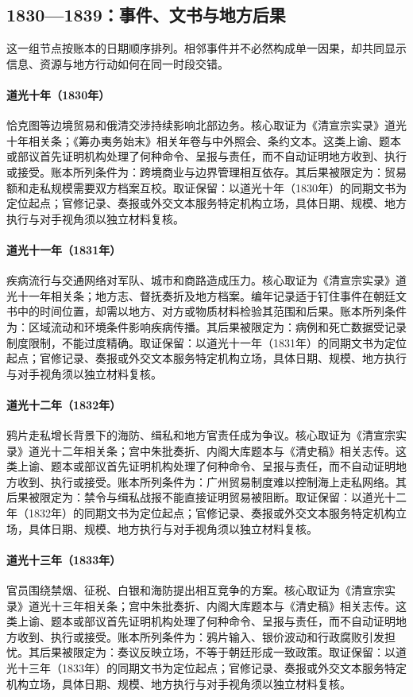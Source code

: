 \subsection{1830—1839：事件、文书与地方后果}
这一组节点按账本的日期顺序排列。相邻事件并不必然构成单一因果，却共同显示信息、资源与地方行动如何在同一时段交错。
\hypertarget{ledger:EQ-1830-RUSSO-QING-TRADE}{}\paragraph{道光十年（1830年）}恰克图等边境贸易和俄清交涉持续影响北部边务。核心取证为《清宣宗实录》道光十年相关条；《筹办夷务始末》相关年卷与中外照会、条约文本。这类上谕、题本或部议首先证明机构处理了何种命令、呈报与责任，而不自动证明地方收到、执行或接受。账本所列条件为：跨境商业与边界管理相互依存。其后果被限定为：贸易额和走私规模需要双方档案互校。取证保留：以道光十年（1830年）的同期文书为定位起点；官修记录、奏报或外交文本服务特定机构立场，具体日期、规模、地方执行与对手视角须以独立材料复核。
\hypertarget{ledger:EQ-1831-CENTRAL-ASIA-CHOLERA}{}\paragraph{道光十一年（1831年）}疾病流行与交通网络对军队、城市和商路造成压力。核心取证为《清宣宗实录》道光十一年相关条；地方志、督抚奏折及地方档案。编年记录适于钉住事件在朝廷文书中的时间位置，却需以地方、对方或物质材料检验其范围和后果。账本所列条件为：区域流动和环境条件影响疾病传播。其后果被限定为：病例和死亡数据受记录制度限制，不能过度精确。取证保留：以道光十一年（1831年）的同期文书为定位起点；官修记录、奏报或外交文本服务特定机构立场，具体日期、规模、地方执行与对手视角须以独立材料复核。
\hypertarget{ledger:EQ-1832-COASTAL-DEFENCE}{}\paragraph{道光十二年（1832年）}鸦片走私增长背景下的海防、缉私和地方官责任成为争议。核心取证为《清宣宗实录》道光十二年相关条；宫中朱批奏折、内阁大库题本与《清史稿》相关志传。这类上谕、题本或部议首先证明机构处理了何种命令、呈报与责任，而不自动证明地方收到、执行或接受。账本所列条件为：广州贸易制度难以控制海上走私网络。其后果被限定为：禁令与缉私战报不能直接证明贸易被阻断。取证保留：以道光十二年（1832年）的同期文书为定位起点；官修记录、奏报或外交文本服务特定机构立场，具体日期、规模、地方执行与对手视角须以独立材料复核。
\hypertarget{ledger:EQ-1833-OPIUM-POLICY-DEBATE}{}\paragraph{道光十三年（1833年）}官员围绕禁烟、征税、白银和海防提出相互竞争的方案。核心取证为《清宣宗实录》道光十三年相关条；宫中朱批奏折、内阁大库题本与《清史稿》相关志传。这类上谕、题本或部议首先证明机构处理了何种命令、呈报与责任，而不自动证明地方收到、执行或接受。账本所列条件为：鸦片输入、银价波动和行政腐败引发担忧。其后果被限定为：奏议反映立场，不等于朝廷形成一致政策。取证保留：以道光十三年（1833年）的同期文书为定位起点；官修记录、奏报或外交文本服务特定机构立场，具体日期、规模、地方执行与对手视角须以独立材料复核。
